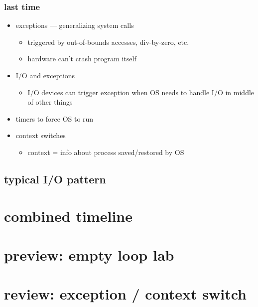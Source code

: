 \date{}
\title{}
\date{}

\begin{frame}
    \titlepage
\end{frame}

\begin{frame}
\frametitle{last time}
\begin{itemize}
\item exceptions --- generalizing system calls
    \begin{itemize}
    \item triggered by out-of-bounds accesses, div-by-zero, etc.
    \item hardware can't crash program itself
    \end{itemize}
\item I/O and exceptions
    \begin{itemize}
    \item I/O devices can trigger exception when OS needs to handle I/O in middle of other things
    \end{itemize}
\item timers to force OS to run
\item context switches
    \begin{itemize}
    \item context = info about process saved/restored by OS
    \end{itemize}
\end{itemize}
\end{frame}

\subsection{typical I/O pattern}




\section{combined timeline}


\section{preview: empty loop lab}


\section{review: exception / context switch}


